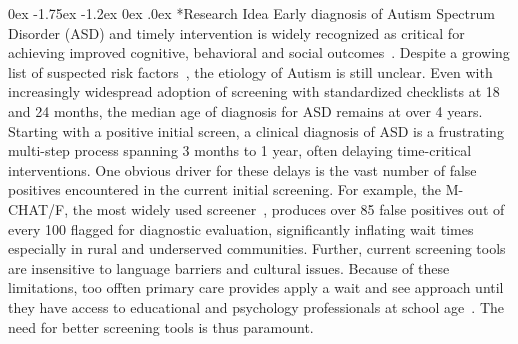\documentclass[onecolumn, compsoc,11pt]{IEEEtran}
\makeatletter
\renewcommand\section{\@startsection {section}{1}{\z@}%
                                   {-1pt \@plus -30ex \@minus 20ex}%
                                   {.1pt}%
                                   {\large\bfseries\scshape}}
\renewcommand\subsection{\@startsection {subsection}{2}{\z@}%
                                   {0ex \@plus -1.75ex \@minus -1.2ex}%
                                   {0ex \@plus.0ex}%
                                   {\fontsize{11}{11}\selectfont\bfseries\sffamily\color{black}}}
\makeatother
\begin{document}




\subsection*{Research Idea}
Early diagnosis of Autism Spectrum Disorder (ASD) and  timely  intervention is widely recognized as critical for achieving improved cognitive, behavioral and social outcomes~\cite{hyman2020identification}.
Despite  a growing list of suspected risk factors~\cite{kalb2012determinants,bisgaier2011access,fenikile2015barriers,pmid27565363}, the etiology of Autism is still unclear. Even with increasingly widespread adoption of screening with standardized checklists at 18 and 24 months, the median age of diagnosis for ASD remains at over 4 years.  Starting with a positive initial screen, a clinical diagnosis of ASD is  a  frustrating multi-step process spanning 3 months to 1 year, often delaying  time-critical interventions. One obvious driver for these delays  is the vast number of false positives encountered in the current initial  screening. For example, the  M-CHAT/F, the most widely used  screener~\cite{robins2014validation,hyman2020identification},  produces    over 85 false positives out of every 100   flagged for  diagnostic evaluation, significantly inflating wait times~\cite{pmid27565363} especially in rural and underserved communities.
Further, current  screening tools are insensitive to language barriers and cultural issues. Because of these limitations, too offten primary care provides apply a wait and see approach until they  have access to educational and psychology professionals at school age~\cite{jashar2016cognitive,hyman2020identification}. The need for better screening tools is thus paramount.
\end{document}
